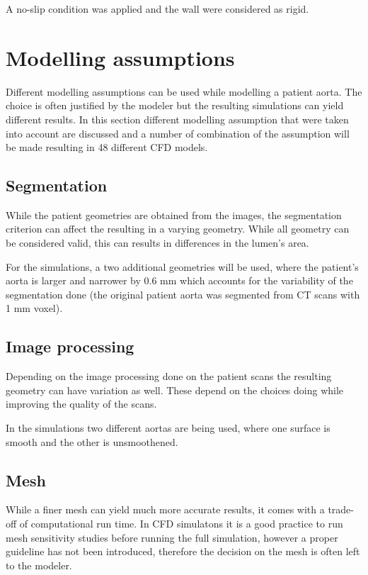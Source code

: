 A no-slip condition was applied and the wall were considered as rigid. \par

\section{Modelling assumptions}
Different modelling assumptions can be used while modelling a patient aorta. The choice is often justified by the modeler but the resulting simulations can yield different results. In this section different modelling assumption that were taken into account are discussed and a number of combination of the assumption will be made resulting in 48 different CFD models.

\subsection{Segmentation}
While the patient geometries are obtained from the images, the segmentation criterion can affect the resulting in a varying geometry. While all geometry can be considered valid, this can results in differences in the lumen's area. \par

For the simulations, a two additional geometries will be used, where the patient's aorta is larger and narrower by 0.6 mm which accounts for the variability of the segmentation done (the original patient aorta was segmented from CT scans with 1 mm voxel). \par

\subsection{Image processing}
Depending on the image processing done on the patient scans the resulting geometry can have variation as well. These depend on the choices doing while improving the quality of the scans. \par

In the simulations two different aortas are being used, where one surface is smooth and the other is unsmoothened.

\subsection{Mesh}
While a finer mesh can yield much more accurate results, it comes with a trade-off of computational run time. In CFD simulatons it is a good practice to run mesh sensitivity studies before running the full simulation, however a proper guideline has not been introduced, therefore the decision on the mesh is often left to the modeler.\par


